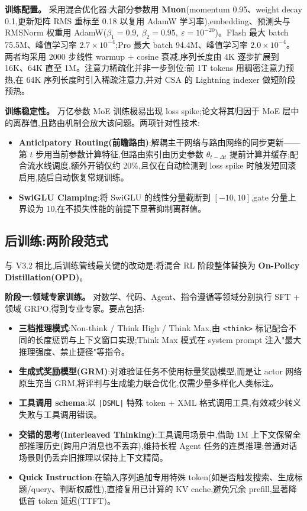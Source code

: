 \documentclass{MathNoteCN}
\begin{document}
\textbf{训练配置。} 采用混合优化器:大部分参数用 \textbf{Muon}(momentum 0.95、weight decay 0.1,更新矩阵 RMS 重标至 0.18 以复用 AdamW 学习率),embedding、预测头与 RMSNorm 权重用 AdamW($\beta_1{=}0.9,\ \beta_2{=}0.95,\ \varepsilon{=}10^{-20}$)。Flash 最大 batch 75.5M、峰值学习率 $2.7{\times}10^{-4}$;Pro 最大 batch 94.4M、峰值学习率 $2.0{\times}10^{-4}$。两者均采用 2000 步线性 warmup + cosine 衰减,序列长度由 4K 逐步扩展到 16K、64K 直至 1M。注意力稀疏化并非一步到位:前 1T tokens 用稠密注意力预热,在 64K 序列长度时引入稀疏注意力,并对 CSA 的 Lightning indexer 做短阶段预热。

\textbf{训练稳定性。} 万亿参数 MoE 训练极易出现 loss spike;论文将其归因于 MoE 层中的离群值,且路由机制会放大该问题。两项针对性技术:
\begin{itemize}
  \item \textbf{Anticipatory Routing(前瞻路由)}:解耦主干网络与路由网络的同步更新——第 $t$ 步用当前参数计算特征,但路由索引由历史参数 $\theta_{t-\Delta t}$ 提前计算并缓存;配合流水线调度,额外开销仅约 20\%,且仅在自动检测到 loss spike 时触发短回滚启用,随后自动恢复常规训练。
  \item \textbf{SwiGLU Clamping}:将 SwiGLU 的线性分量截断到 $[-10,10]$,gate 分量上界设为 10,在不损失性能的前提下显著抑制离群值。
\end{itemize}

\subsection{后训练:两阶段范式}

与 V3.2 相比,后训练管线最关键的改动是:将混合 RL 阶段整体替换为 \textbf{On-Policy Distillation(OPD)}\cite{arxiv}。

\textbf{阶段一:领域专家训练。} 对数学、代码、Agent、指令遵循等领域分别执行 SFT + 领域 GRPO,得到专业专家。要点包括:
\begin{itemize}
  \item \textbf{三档推理模式}:Non-think / Think High / Think Max,由 \texttt{<think>} 标记配合不同的长度惩罚与上下文窗口实现;Think Max 模式在 system prompt 注入"最大推理强度、禁止捷径"等指令。
  \item \textbf{生成式奖励模型(GRM)}:对难验证任务不使用标量奖励模型,而是让 actor 网络原生充当 GRM,将评判与生成能力联合优化,仅需少量多样化人类标注。
  \item \textbf{工具调用 schema}:以 \texttt{|DSML|} 特殊 token + XML 格式调用工具,有效减少转义失败与工具调用错误。
  \item \textbf{交错的思考(Interleaved Thinking)}:工具调用场景中,借助 1M 上下文保留全部推理历史(跨用户消息也不丢弃),维持长程 Agent 任务的连贯推理;普通对话场景则仍丢弃旧推理以保持上下文精简。
  \item \textbf{Quick Instruction}:在输入序列追加专用特殊 token(如是否触发搜索、生成标题/query、判断权威性),直接复用已计算的 KV cache,避免冗余 prefill,显著降低首 token 延迟(TTFT)。
\end{itemize}
\end{document}
